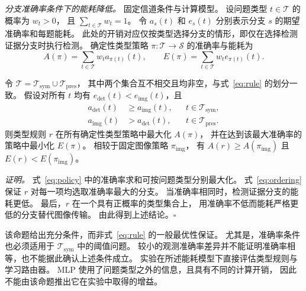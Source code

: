\emph{分支准确率条件下的能耗降低。}
固定信道条件与计算模型。
设问题类型 $t\in\mathcal T$ 的概率为 $w_t>0$，
且 $\sum_{t\in\mathcal T}w_t=1$。
令 $a_s(t)$ 和 $e_s(t)$ 分别表示分支 $s$ 的期望准确率和每题能耗。
此处的开销对应仅按类型选择分支的情形，即仅在选择检测证据分支时执行检测。
确定性类型策略 $\pi:\mathcal T\to\mathcal S$ 的准确率与能耗为
\begin{equation}
A(\pi)=\sum_{t\in\mathcal T}w_t a_{\pi(t)}(t),
\qquad
E(\pi)=\sum_{t\in\mathcal T}w_t e_{\pi(t)}(t).
\label{eq:policy}
\end{equation}

\begin{proposition}[有条件的能耗与准确率优势]\label{prop:pareto}
令 $\mathcal T=\mathcal T_{\mathrm{sym}}\cup\mathcal T_{\mathrm{pres}}$，
其中两个集合互不相交且均非空，与式~\eqref{eq:rule} 的划分一致。
假设对所有 $t$ 均有 $e_{\mathrm{det}}(t)<e_{\mathrm{img}}(t)$，且
\begin{equation}
\begin{aligned}
a_{\mathrm{det}}(t)&\ge a_{\mathrm{img}}(t),
&&t\in\mathcal T_{\mathrm{sym}},\\
a_{\mathrm{img}}(t)&>a_{\mathrm{det}}(t),
&&t\in\mathcal T_{\mathrm{pres}}.
\end{aligned}
\label{eq:ordering}
\end{equation}
则类型规则 $r$ 在所有确定性类型策略中最大化 $A(\pi)$，
并在达到该最大准确率的策略中最小化 $E(\pi)$。
相较于固定图像策略 $\pi_{\mathrm{img}}$，
有 $A(r)\ge A(\pi_{\mathrm{img}})$ 且 $E(r)<E(\pi_{\mathrm{img}})$。
\end{proposition}

\emph{证明。}
式~\eqref{eq:policy} 中的准确率求和可按问题类型分别最大化。
式~\eqref{eq:ordering} 保证 $r$ 对每一项均选取准确率最大的分支。
当准确率相同时，检测证据分支的能耗更低。
最后，$r$ 在一个具有正概率的类型集合上，
用准确率不低而能耗严格更低的分支替代图像传输。
由此得到上述结论。\hfill$\square$

该命题给出充分条件，而非式~\eqref{eq:rule} 的一般最优性保证。
尤其是，准确率条件也必须适用于 $\mathcal T_{\mathrm{sym}}$ 中的阈值问题。
较小的观测准确率差异并不能证明准确率相等，也不能据此确认上述条件成立。
实验在所述能耗模型下直接评估类型规则与学习路由器。
MLP 使用了问题类型之外的信息，且具有不同的计算开销，
因此不能由该命题推出它在实验中取得的增益。
